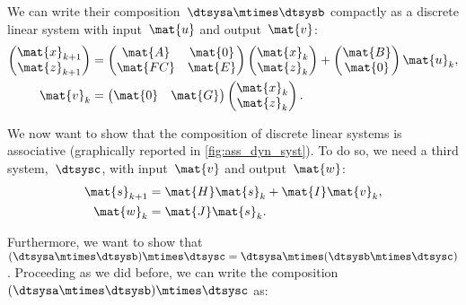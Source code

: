 We can write their composition~$\dtsysa\mtimes \dtsysb$ compactly as a discrete linear system with input~$\mat{u}$ and output~$\mat{v}$:
%
\begin{equation*}
	\label{eq:dlin-3}
	\begin{aligned}
		\begin{pmatrix}
			\mat{x}_{k+1} \\
			\mat{z}_{k+1}
		\end{pmatrix} & =
		\begin{pmatrix}
			\mat{A}  & \mat{0} \\
			\mat{FC} & \mat{E}
		\end{pmatrix}
		\begin{pmatrix}
			\mat{x}_k \\ \mat{z}_k
		\end{pmatrix}
		+
		\begin{pmatrix}
			\mat{B} \\ \mat{0}
		\end{pmatrix}\mat{u}_k, \\
		\mat{v}_k                 & =
		\begin{pmatrix}
			\mat{0} & \mat{G}
		\end{pmatrix}
		\begin{pmatrix}
			\mat{x}_k \\ \mat{z}_k
		\end{pmatrix}.
	\end{aligned}
\end{equation*}

We now want to show that the composition of discrete linear systems is associative (graphically reported in \cref{fig:ass_dyn_syst}).
To do so, we need a third system,~$\dtsysc$, with input~$\mat{v}$ and output~$\mat{w}$:
\begin{equation*}
	\label{eq:dlin-4}
	\begin{aligned}
		\mat{s}_{k+1} & = \mat{H} \mat{s}_k + \mat{I} \mat{v}_k, \\
		\mat{w}_{k}   & = \mat{J} \mat{s}_k.
	\end{aligned}
\end{equation*}

Furthermore, we want to show that~$(\dtsysa\mtimes \dtsysb)\mtimes \dtsysc=\dtsysa\mtimes (\dtsysb\mtimes \dtsysc)$.
Proceeding as we did before, we can write the composition~$(\dtsysa\mtimes \dtsysb)\mtimes \dtsysc$ as:

